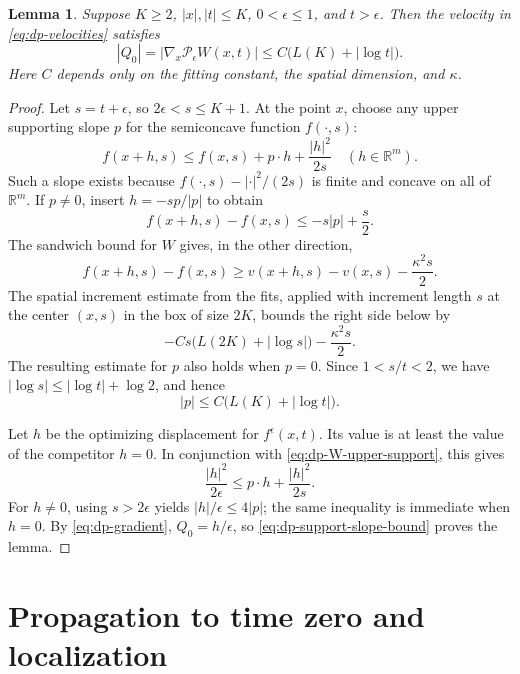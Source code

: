 \documentclass[11pt]{article}
\numberwithin{equation}{section}
\newtheorem{lemma}[theorem]{Lemma}
\theoremstyle{definition}
\theoremstyle{remark}
\newcommand{\R}{\mathbb{R}}
\newcommand{\Penv}{\mathcal{P}}
\begin{document}
\begin{lemma}\label{lem:dp-log-velocity}
Suppose $K\ge2$, $|x|,|t|\le K$, $0<\epsilon\le1$, and $t>\epsilon$.
Then the velocity in \eqref{eq:dp-velocities} satisfies
\begin{equation}\label{eq:dp-log-velocity}
  |Q_0|=|\nabla_x\Penv_\epsilon W(x,t)|
       \le C\bigl(L(K)+|\log t|\bigr).
\end{equation}
Here $C$ depends only on the fitting constant, the spatial dimension, and
$\kappa$.
\end{lemma}

\begin{proof}
Let $s=t+\epsilon$, so $2\epsilon<s\le K+1$.  At the point $x$, choose any
upper supporting slope $p$ for the semiconcave function $f(\cdot,s)$:
\begin{equation}\label{eq:dp-W-upper-support}
  f(x+h,s)\le f(x,s)+p\cdot h+\frac{|h|^2}{2s}
  \quad(h\in\R^m).
\end{equation}
Such a slope exists because $f(\cdot,s)-|\cdot|^2/(2s)$ is finite and
concave on all of $\R^m$.  If $p\ne0$, insert $h=-sp/|p|$ to obtain
\[
  f(x+h,s)-f(x,s)\le-s|p|+\frac{s}{2}.
\]
The sandwich bound for $W$ gives, in the other direction,
\[
  f(x+h,s)-f(x,s)
    \ge v(x+h,s)-v(x,s)-\frac{\kappa^2s}{2}.
\]
The spatial increment estimate from the fits, applied with increment length
$s$ at the center $(x,s)$ in the box of size $2K$, bounds the right side
below by
\[
  -Cs\bigl(L(2K)+|\log s|\bigr)-\frac{\kappa^2s}{2}.
\]
The resulting estimate for $p$ also holds when $p=0$.  Since
$1<s/t<2$, we have $|\log s|\le|\log t|+\log2$, and hence
\begin{equation}\label{eq:dp-support-slope-bound}
  |p|\le C\bigl(L(K)+|\log t|\bigr).
\end{equation}

Let $h$ be the optimizing displacement for $f^\epsilon(x,t)$.  Its value
is at least the value of the competitor $h=0$.  In conjunction with
\eqref{eq:dp-W-upper-support}, this gives
\[
  \frac{|h|^2}{2\epsilon}\le p\cdot h+\frac{|h|^2}{2s}.
\]
For $h\ne0$, using $s>2\epsilon$ yields $|h|/\epsilon\le4|p|$; the same
inequality is immediate when $h=0$.  By \eqref{eq:dp-gradient},
$Q_0=h/\epsilon$, so \eqref{eq:dp-support-slope-bound} proves the lemma.
\end{proof}

\section{Propagation to time zero and localization}\label{sec:contact-localization}
\end{document}

